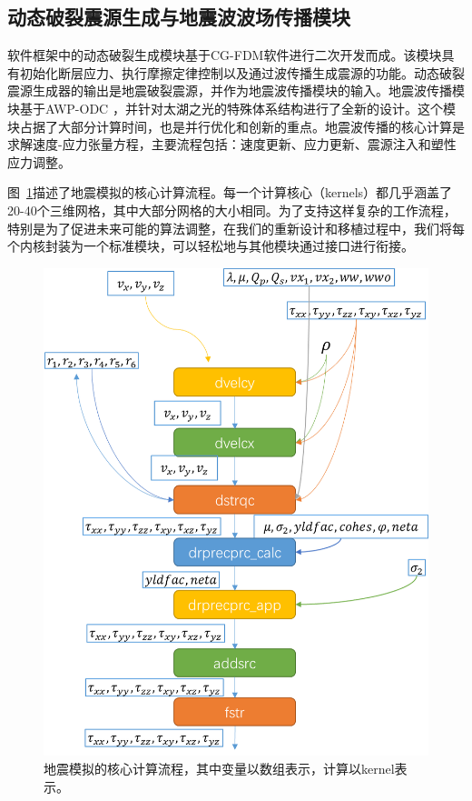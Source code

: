 \documentclass[degree=doctor]{thuthesis}
\begin{document}
\subsection{动态破裂震源生成与地震波波场传播模块}

软件框架中的动态破裂生成模块基于CG-FDM软件\citep{zhang2014three}进行二次开发而成。该模块具有初始化断层应力、执行摩擦定律控制以及通过波传播生成震源的功能。动态破裂震源生成器的输出是地震破裂震源，并作为地震波传播模块的输入。地震波传播模块基于AWP-ODC \citep {cui2010scalable}，并针对太湖之光的特殊体系结构进行了全新的设计。这个模块占据了大部分计算时间，也是并行优化和创新的重点。地震波传播的核心计算是求解速度-应力张量方程，主要流程包括：速度更新、应力更新、震源注入和塑性应力调整。

图~\ref{fig:awp-workflow}描述了地震模拟的核心计算流程。每一个计算核心（kernels）都几乎涵盖了20-40个三维网格，其中大部分网格的大小相同。为了支持这样复杂的工作流程，特别是为了促进未来可能的算法调整，在我们的重新设计和移植过程中，我们将每个内核封装为一个标准模块，可以轻松地与其他模块通过接口进行衔接。

\begin{figure}[ht]
\centering
\includegraphics[width=0.8\columnwidth]{awp_chart.jpg}
\caption{地震模拟的核心计算流程，其中变量以数组表示，计算以kernel表示。}
\label{fig:awp-workflow}
\end{figure}
\end{document}
